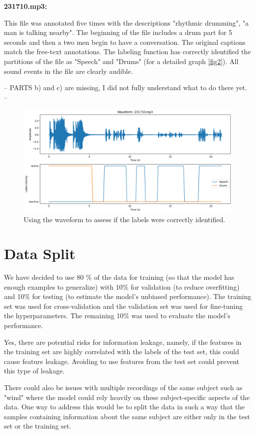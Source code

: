 \documentclass{article}
\begin{document}
\textbf{231710.mp3:}

This file was annotated five times with the descriptions "rhythmic drumming", "a man is talking nearby". The beginning of the file includes a drum part for 5 seconds and then a two men begin to have a conversation. The original captions match the free-text annotations. The labeling function has correctly identified the partitions of the file as "Speech" and "Drums" (for a detailed graph \autoref{fig2}). All sound events in the file are clearly audible.

-- PARTS b) and c) are missing, I did not fully understand what to do there yet. --

\begin{figure}
  \centering
  \includegraphics[width=\linewidth]{output2.png}
  \caption{Using the waveform to assess if the labels were correctly identified.}
  \label{fig2}
\end{figure}

\section{Data Split}
We have decided to use 80 \% of the data for training (so that the model has enough examples to generalize) with 10\% for validation (to reduce overfitting) and 10\% for testing (to estimate the model's unbiased performance). The training set was used for cross-validation and the validation set was used for fine-tuning the hyperparameters. The remaining 10\% was used to evaluate the model's performance.

Yes, there are potential risks for information leakage, namely, if the features in the training set are highly correlated with the labels of the test set, this could cause feature leakage. Avoiding to use features from the test set could prevent this type of leakage. 

There could also be issues with multiple recordings of the same subject such as "wind" where the model could rely heavily on these subject-specific aspects of the data. One way to address this would be to split the data in such a way that the samples containing information about the same subject are either only in the test set or the training set. 
\end{document}

